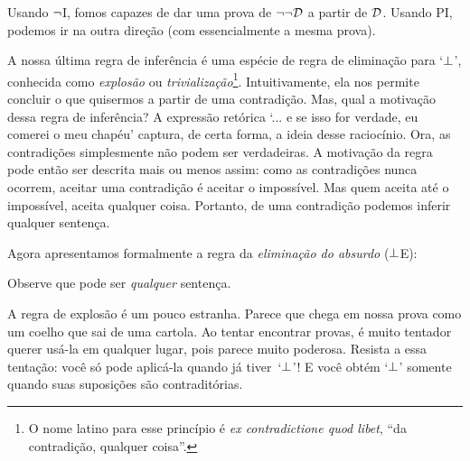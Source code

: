 Usando $\neg$I, fomos capazes de dar uma prova de $\neg\neg\mathcal{D}$ a partir de $\mathcal{D}$. Usando PI, podemos ir na outra direção (com essencialmente a mesma prova).
	\begin{fitchproof}
		\open
		\close
	\end{fitchproof}

A nossa última regra de inferência é uma espécie de regra de eliminação para `$\bot$', conhecida como \emph{explosão} ou \emph{trivialização}\footnote{O nome latino para esse princípio é  \emph{ex contradictione quod libet}, ``da contradição, qualquer coisa''.}.  Intuitivamente, ela nos permite concluir o que quisermos a partir de uma contradição. Mas, qual a motivação dessa regra de inferência? A expressão retórica `... e se isso for verdade, eu comerei o meu chapéu' captura, de certa forma, a ideia desse raciocínio. Ora, as contradições simplesmente não podem ser verdadeiras. A motivação da regra pode então ser descrita mais ou menos assim: como as contradições nunca ocorrem, aceitar uma contradição é aceitar o impossível. Mas quem aceita até o impossível, aceita qualquer coisa. Portanto, de uma contradição podemos inferir qualquer sentença.

Agora apresentamos formalmente a regra da \textit{eliminação do absurdo} ($\bot$E):

Observe que   pode ser \emph{qualquer} sentença.

A regra de explosão é um pouco estranha. Parece que    chega em nossa prova como um coelho que sai de uma cartola. Ao tentar encontrar provas, é muito tentador querer usá-la em qualquer lugar, pois parece muito poderosa. Resista a essa tentação: você só pode aplicá-la quando já tiver~`$\bot$'!   E você obtém `$\bot$'   somente quando suas suposições são contraditórias.
 

